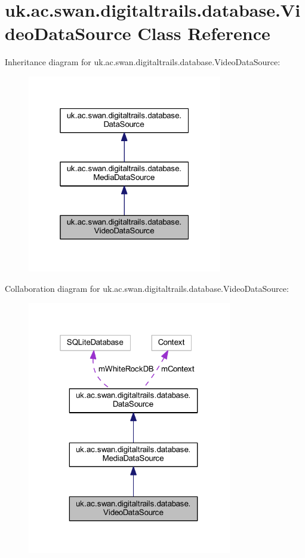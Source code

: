 \hypertarget{classuk_1_1ac_1_1swan_1_1digitaltrails_1_1database_1_1_video_data_source}{\section{uk.\+ac.\+swan.\+digitaltrails.\+database.\+Video\+Data\+Source Class Reference}
\label{classuk_1_1ac_1_1swan_1_1digitaltrails_1_1database_1_1_video_data_source}
}


Inheritance diagram for uk.\+ac.\+swan.\+digitaltrails.\+database.\+Video\+Data\+Source\+:\nopagebreak
\begin{figure}[H]
\begin{center}
\leavevmode
\includegraphics[width=241pt]{classuk_1_1ac_1_1swan_1_1digitaltrails_1_1database_1_1_video_data_source__inherit__graph}
\end{center}
\end{figure}


Collaboration diagram for uk.\+ac.\+swan.\+digitaltrails.\+database.\+Video\+Data\+Source\+:\nopagebreak
\begin{figure}[H]
\begin{center}
\leavevmode
\includegraphics[width=253pt]{classuk_1_1ac_1_1swan_1_1digitaltrails_1_1database_1_1_video_data_source__coll__graph}
\end{center}
\end{figure}
